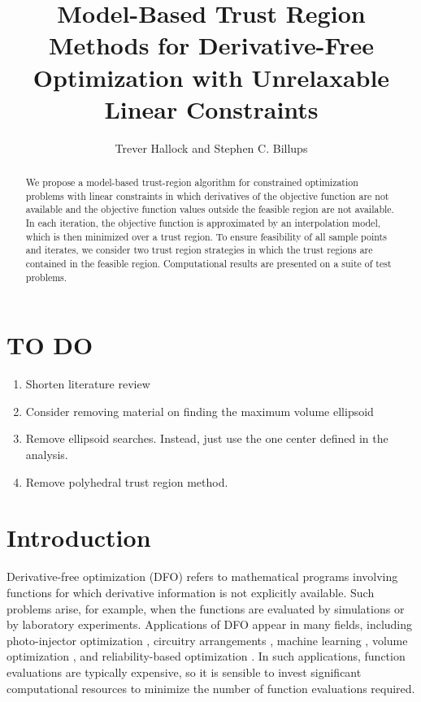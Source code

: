 \documentclass{article}
\title{Model-Based Trust Region Methods for Derivative-Free Optimization with Unrelaxable Linear Constraints}
\author{Trever Hallock and Stephen C. Billups}
\begin{document}
\maketitle

\begin{abstract}

We propose a model-based trust-region algorithm for constrained optimization problems with linear constraints in which derivatives of the objective function are not available and the objective function values outside the feasible region are not available.
In each iteration, the objective function is approximated by an interpolation model, which is then minimized over a trust region.
To ensure feasibility of all sample points and iterates, we consider two trust region strategies in which the trust regions are contained in the feasible region.
Computational results are presented on a suite of test problems.

\end{abstract}

\newpage


\newpage
\section{TO DO}
\begin{enumerate}
\item Shorten literature review
\item Consider removing material on finding the maximum volume ellipsoid
\item Remove ellipsoid searches.  Instead, just use the one center defined in the analysis.  
\item Remove polyhedral trust region method.
\end{enumerate}
\section{Introduction}
Derivative-free optimization (DFO) refers to mathematical programs involving functions for which derivative information is not explicitly available.
Such problems arise, for example, when the functions are evaluated by simulations or by laboratory experiments.
Applications of DFO appear in many fields, including photo-injector optimization \cite{Neveu2017},
circuitry arrangements \cite{PLOSKAS201816}, machine learning \cite{KS2018}, volume optimization \cite{Cheng2017}, and reliability-based optimization \cite{Gao2017}.
In such applications, function evaluations are typically expensive, 
so it is sensible to invest significant computational resources to minimize the number of function evaluations required.
\end{document}

